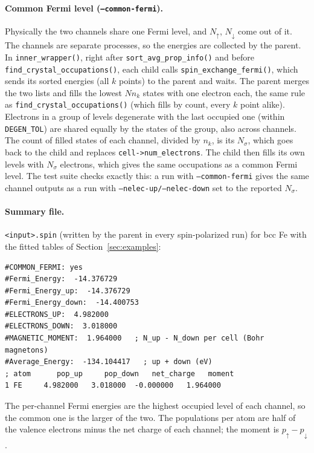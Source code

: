 \documentclass[11pt,a4paper]{article}
\newcommand{\fn}[1]{\texttt{#1()}}
\newcommand{\var}[1]{\texttt{#1}}
\newcommand{\opt}[1]{\texttt{#1}}
\begin{document}
\paragraph{Common Fermi level (\opt{--common-fermi}).} Physically the two channels share
one Fermi level, and $N_\uparrow$, $N_\downarrow$ come out of it. The channels are
separate processes, so the energies are collected by the parent. In
\fn{inner\_wrapper}, right after \fn{sort\_avg\_prop\_info} and before
\fn{find\_crystal\_occupations}, each child calls \fn{spin\_exchange\_fermi}, which sends
its sorted energies (all $k$ points) to the parent and waits. The parent merges the two
lists and fills the lowest $N n_k$ states with one electron each, the same rule as
\fn{find\_crystal\_occupations} (which fills by count, every $k$ point alike). Electrons
in a group of levels degenerate with the last occupied one (within \var{DEGEN\_TOL}) are
shared equally by the states of the group, also across channels. The count of filled
states of each channel, divided by $n_k$, is its $N_\sigma$, which goes back to the child
and replaces \var{cell->num\_electrons}. The child then fills its own levels with
$N_\sigma$ electrons, which gives the same occupations as a common Fermi level. The test
suite checks exactly this: a run with \opt{--common-fermi} gives the same channel outputs
as a run with \opt{--nelec-up/--nelec-down} set to the reported $N_\sigma$.

\paragraph{Summary file.} \texttt{<input>.spin} (written by the parent in every
spin-polarized run) for bcc Fe with the fitted tables of Section~\ref{sec:examples}:
\begin{lstlisting}[style=sh]
#COMMON_FERMI: yes
#Fermi_Energy:  -14.376729
#Fermi_Energy_up:  -14.376729
#Fermi_Energy_down:  -14.400753
#ELECTRONS_UP:  4.982000
#ELECTRONS_DOWN:  3.018000
#MAGNETIC_MOMENT:  1.964000   ; N_up - N_down per cell (Bohr magnetons)
#Average_Energy:  -134.104417   ; up + down (eV)
; atom      pop_up     pop_down   net_charge   moment
1 FE     4.982000   3.018000  -0.000000   1.964000
\end{lstlisting}
The per-channel Fermi energies are the highest occupied level of each channel, so the
common one is the larger of the two. The populations per atom are half of the valence
electrons minus the net charge of each channel; the moment is $p_\uparrow-p_\downarrow$.
\end{document}
